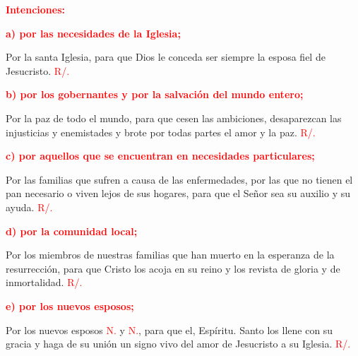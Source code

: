 \documentclass[12pt, letterpaper]{report}
\begin{document}
\large {\bfseries \textcolor{red}{Intenciones:}} \newline

\large {\bfseries \textcolor{red}{a) por las necesidades de la Iglesia;}} \newline

\Large Por la santa Iglesia, para que Dios le conceda ser siempre la esposa fiel de Jesucristo. \hspace{1cm} \textcolor{red}{R/.}\newline

\large {\bfseries \textcolor{red}{b) por los gobernantes y por la salvaci\'on del mundo entero;}} \newline

\Large Por la paz de todo el mundo, para que cesen las ambiciones, desaparezcan las injusticias y enemistades y brote por todas partes el amor y la paz. \hspace{1cm} \textcolor{red}{R/.}\newline

\large {\bfseries \textcolor{red}{c) por aquellos que se encuentran en necesidades particulares;}} \newline

\Large Por las familias que sufren a causa de las enfermedades, por las que no tienen el pan necesario o viven lejos de sus hogares, para que el Se\~nor sea su auxilio y su ayuda. \hspace{1cm} \textcolor{red}{R/.}\newline

\large {\bfseries \textcolor{red}{d) por la comunidad local;}} \newline

\Large Por los miembros de nuestras familias que han muerto en la esperanza de la resurrecci\'on, para que Cristo los acoja en su reino y los revista de gloria y de inmortalidad. \hspace{1cm} \textcolor{red}{R/.}\newline

\large {\bfseries \textcolor{red}{e) por los nuevos esposos;}} \newline

\Large Por los nuevos esposos \textcolor{red}{N.} y \textcolor{red}{N.}, para que el, Esp\'iritu. Santo los llene con su gracia y haga de su uni\'on un signo vivo del amor de Jesucristo a su Iglesia. \hspace{1cm} \textcolor{red}{R/.} \newline
\end{document}
